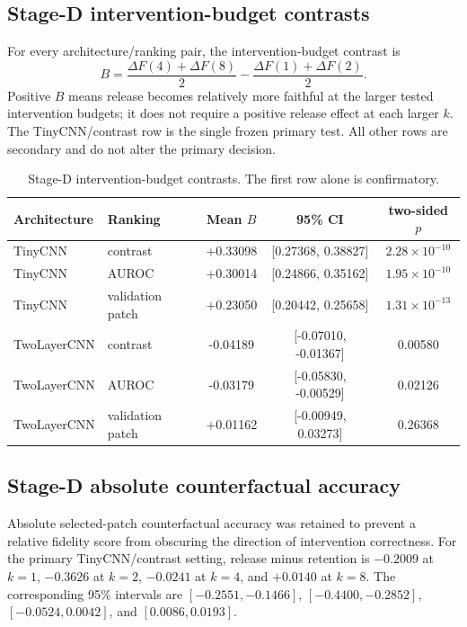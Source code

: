\subsection{Stage-D intervention-budget contrasts}\label{app:stage-d-b}

For every architecture/ranking pair, the intervention-budget contrast is
\[
B=\frac{\Delta F(4)+\Delta F(8)}{2}-\frac{\Delta F(1)+\Delta F(2)}{2}.
\]
Positive $B$ means release becomes relatively more faithful at the larger tested intervention budgets; it does not require a positive release effect at each larger $k$. The TinyCNN/contrast row is the single frozen primary test. All other rows are secondary and do not alter the primary decision.

\begin{table}[h]
\centering
\small
\begin{tabular}{llccc}
\toprule
Architecture & Ranking & Mean $B$ & 95\% CI & two-sided $p$ \\
\midrule
TinyCNN & contrast & +0.33098 & [0.27368, 0.38827] & $2.28\times10^{-10}$ \\
TinyCNN & AUROC & +0.30014 & [0.24866, 0.35162] & $1.95\times10^{-10}$ \\
TinyCNN & validation patch & +0.23050 & [0.20442, 0.25658] & $1.31\times10^{-13}$ \\
TwoLayerCNN & contrast & -0.04189 & [-0.07010, -0.01367] & 0.00580 \\
TwoLayerCNN & AUROC & -0.03179 & [-0.05830, -0.00529] & 0.02126 \\
TwoLayerCNN & validation patch & +0.01162 & [-0.00949, 0.03273] & 0.26368 \\
\bottomrule
\end{tabular}
\caption{Stage-D intervention-budget contrasts. The first row alone is confirmatory.}
\label{tab:stage-d-b}
\end{table}

\subsection{Stage-D absolute counterfactual accuracy}\label{app:stage-d-cf}

Absolute selected-patch counterfactual accuracy was retained to prevent a relative fidelity score from obscuring the direction of intervention correctness. For the primary TinyCNN/contrast setting, release minus retention is $-0.2009$ at $k=1$, $-0.3626$ at $k=2$, $-0.0241$ at $k=4$, and $+0.0140$ at $k=8$. The corresponding 95\% intervals are $[-0.2551,-0.1466]$, $[-0.4400,-0.2852]$, $[-0.0524,0.0042]$, and $[0.0086,0.0193]$.

